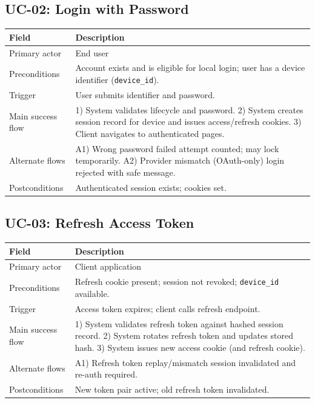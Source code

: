 \documentclass[11pt]{article}
\begin{document}
    \subsection{UC-02: Login with Password}
    \begin{tabularx}{\textwidth}{@{}lX@{}}
\toprule
\textbf{Field} & \textbf{Description} \\
\midrule
Primary actor & End user \\
Preconditions & Account exists and is eligible for local login; user has a device identifier (\texttt{device\_id}). \\
Trigger & User submits identifier and password. \\
Main success flow &
1) System validates lifecycle and password. 2) System creates session record for device and issues access/refresh cookies. 3) Client navigates to authenticated pages. \\
Alternate flows & A1) Wrong password \textrightarrow{} failed attempt counted; may lock temporarily. A2) Provider mismatch (OAuth-only) \textrightarrow{} login rejected with safe message. \\
Postconditions & Authenticated session exists; cookies set. \\
\bottomrule
    \end{tabularx}

    \subsection{UC-03: Refresh Access Token}
    \begin{tabularx}{\textwidth}{@{}lX@{}}
\toprule
\textbf{Field} & \textbf{Description} \\
\midrule
Primary actor & Client application \\
Preconditions & Refresh cookie present; session not revoked; \texttt{device\_id} available. \\
Trigger & Access token expires; client calls refresh endpoint. \\
Main success flow &
1) System validates refresh token against hashed session record. 2) System rotates refresh token and updates stored hash. 3) System issues new access cookie (and refresh cookie). \\
Alternate flows & A1) Refresh token replay/mismatch \textrightarrow{} session invalidated and re-auth required. \\
Postconditions & New token pair active; old refresh token invalidated. \\
\bottomrule
    \end{tabularx}
\end{document}
